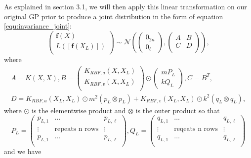 \documentclass{statsmsc}
\begin{document}
As explained in section 3.1, we will then apply this linear transformation on our original GP prior to produce a joint distribution in the form of equation \ref{equ:invariance_joint}:
\begin{equation}
\begin{pmatrix}
    \mathbf{f}(X)\\
    L([\mathbf{f}(X_L)])\\
\end{pmatrix}
\sim\mathcal{N}
\left(\begin{pmatrix}
    0_{2n}\\0_{\ell}
\end{pmatrix},\begin{pmatrix}
   A & B \\
   C & D\\ 
\end{pmatrix}\right),
\label{equ:jointABCD}
\end{equation}
where
\begin{equation}
\begin{gathered}
A=K(X,X), B=\begin{pmatrix}
    K_{RBF,a}(X, X_L) \\ K_{RBF,v}(X, X_L) \\
\end{pmatrix}\odot \begin{pmatrix}
    mP_L \\ kQ_L
\end{pmatrix}, C=B^T,\\ D=K_{RBF,a}(X_L, X_L)\odot m^2(p_L\otimes p_L) + K_{RBF,v}(X_L, X_L)\odot k^2(q_L\otimes q_L),
\end{gathered}
\label{equ:ABCD}
\end{equation}
where $\odot$ is the elementwise product and $\otimes$ is the outer product so that 
$$
P_L=\begin{pmatrix}
  p_{L,1}  & \dots & p_{L,\ell}  \\
  \vdots & \text{repeats n rows} &  \vdots\\
  p_{L,1}  & \dots & p_{L,\ell}  \\
\end{pmatrix},
Q_L=\begin{pmatrix}
  q_{L,1}  & \dots & q_{L,\ell}  \\
  \vdots & \text{reqeats n rows} &  \vdots\\
  q_{L,1}  & \dots & q_{L,\ell}  \\
\end{pmatrix}
$$
and we have 
\end{document}
